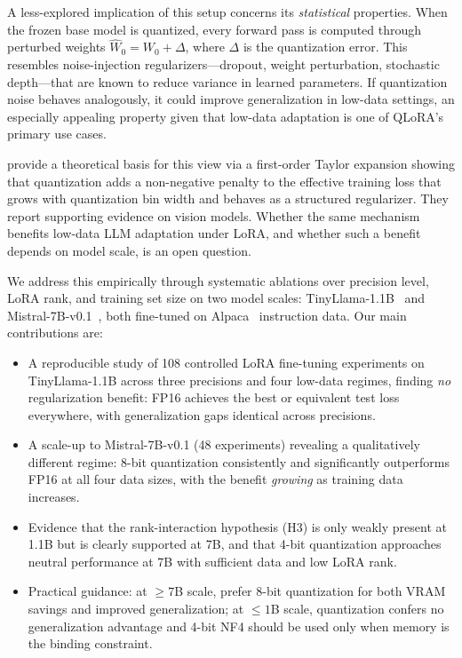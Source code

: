 \documentclass{article}
\begin{document}
A less-explored implication of this setup concerns its \emph{statistical} properties.
When the frozen base model is quantized, every forward pass is computed through
perturbed weights $\hat{W}_0 = W_0 + \Delta$, where $\Delta$ is the quantization
error. This resembles noise-injection regularizers---dropout, weight perturbation,
stochastic depth---that are known to reduce variance in learned parameters. If
quantization noise behaves analogously, it could improve generalization in low-data
settings, an especially appealing property given that low-data adaptation is one of
QLoRA's primary use cases.

\citet{askarihemmat2024quantization} provide a theoretical basis for this view via a
first-order Taylor expansion showing that quantization adds a non-negative penalty to
the effective training loss that grows with quantization bin width and behaves as a
structured regularizer. They report supporting evidence on vision models. Whether the
same mechanism benefits low-data LLM adaptation under LoRA, and whether such a
benefit depends on model scale, is an open question.

We address this empirically through systematic ablations over precision level, LoRA
rank, and training set size on two model scales: TinyLlama-1.1B~\citep{zhang2024tinyllama}
and Mistral-7B-v0.1~\citep{jiang2023mistral}, both fine-tuned on Alpaca~\citep{taori2023alpaca}
instruction data. Our main contributions are:
\begin{itemize}[nosep]
  \item A reproducible study of 108 controlled LoRA fine-tuning experiments on
    TinyLlama-1.1B across three precisions and four low-data regimes, finding
    \emph{no} regularization benefit: FP16 achieves the best or equivalent test
    loss everywhere, with generalization gaps identical across precisions.
  \item A scale-up to Mistral-7B-v0.1 (48 experiments) revealing a qualitatively
    different regime: 8-bit quantization consistently and significantly outperforms
    FP16 at all four data sizes, with the benefit \emph{growing} as training data
    increases.
  \item Evidence that the rank-interaction hypothesis (H3) is only weakly present
    at 1.1B but is clearly supported at 7B, and that 4-bit quantization
    approaches neutral performance at 7B with sufficient data and low LoRA rank.
  \item Practical guidance: at $\geq\!7$B scale, prefer 8-bit quantization for
    both VRAM savings and improved generalization; at $\leq\!1$B scale,
    quantization confers no generalization advantage and 4-bit NF4 should be
    used only when memory is the binding constraint.
\end{itemize}
\end{document}
